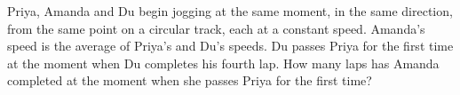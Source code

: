 Priya, Amanda and Du begin jogging at the same moment, in the same direction, from the same point on a circular track, each at a constant speed. Amanda's speed is the average of Priya's and Du's speeds. Du passes Priya for the first time at the moment when Du completes his fourth lap. How many laps has Amanda completed at the moment when she passes Priya for the first time?

